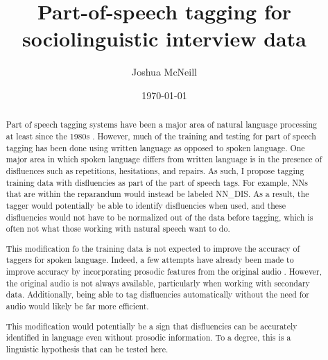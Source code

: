 \documentclass{article}
\title{Part-of-speech tagging for sociolinguistic interview data}
\author{Joshua McNeill}
\date{\today}
\begin{document}
  \maketitle
  \begin{abstract}
    Part of speech tagging systems have been a major area of natural language processing at least since the 1980s \parencite[e.g.,][]{garside_claws_1987}.
    However, much of the training and testing for part of speech tagging has been done using written language as opposed to spoken language.
    One major area in which spoken language differs from written language is in the presence of disfluences such as repetitions, hesitations, and repairs.
    As such, I propose tagging training data with disfluencies as part of the part of speech tags.
    For example, NNs that are within the reparandum would instead be labeled NN\_DIS.
    As a result, the tagger would potentially be able to identify disfluencies when used, and these disfluencies would not have to be normalized out of the data before tagging, which is often not what those working with natural speech want to do.

    This modification fo the training data is not expected to improve the accuracy of taggers for spoken language.
    Indeed, a few attempts have already been made to improve accuracy by incorporating prosodic features from the original audio \parencite[e.g.,][]{christodoulides_dismo:_2018}.
    However, the original audio is not always available, particularly when working with secondary data.
    Additionally, being able to tag disfluencies automatically without the need for audio would likely be far more efficient.

    This modification would potentially be a sign that disfluencies can be accurately identified in language even without prosodic information.
    To a degree, this is a linguistic hypothesis that can be tested here.
  \end{abstract}

  \printbibliography
\end{document}
